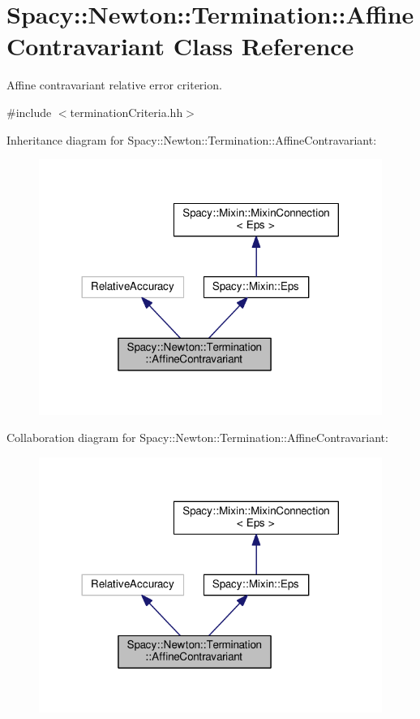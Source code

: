 \hypertarget{classSpacy_1_1Newton_1_1Termination_1_1AffineContravariant}{\section{Spacy\-:\-:Newton\-:\-:Termination\-:\-:Affine\-Contravariant Class Reference}
\label{classSpacy_1_1Newton_1_1Termination_1_1AffineContravariant}
}


Affine contravariant relative error criterion.  




{\ttfamily \#include $<$termination\-Criteria.\-hh$>$}



Inheritance diagram for Spacy\-:\-:Newton\-:\-:Termination\-:\-:Affine\-Contravariant\-:
\nopagebreak
\begin{figure}[H]
\begin{center}
\leavevmode
\includegraphics[width=317pt]{classSpacy_1_1Newton_1_1Termination_1_1AffineContravariant__inherit__graph}
\end{center}
\end{figure}


Collaboration diagram for Spacy\-:\-:Newton\-:\-:Termination\-:\-:Affine\-Contravariant\-:
\nopagebreak
\begin{figure}[H]
\begin{center}
\leavevmode
\includegraphics[width=317pt]{classSpacy_1_1Newton_1_1Termination_1_1AffineContravariant__coll__graph}
\end{center}
\end{figure}
